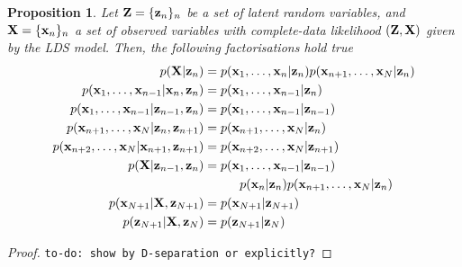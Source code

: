 \documentclass[11pt]{article}
\newtheorem{proposition}{Proposition}[section]
\begin{document}
\begin{proposition}\label{prop:graphical-models-separation}
	Let ${\bf Z} = \{{\bf z}_n\}_n$ be a set of latent random variables, and ${\bf X} = \{{\bf x}_n\}_n$ a set of observed variables with complete-data likelihood $({\bf Z}, {\bf X})$ given by the LDS model. Then, the following factorisations hold true
	\begin{align}
		p({\bf X}\vert{\bf z}_n) &= p({{\bf x}_1, \ldots, {\bf x}_n \vert {\bf z}_n})p({{\bf x}_{n+1}, \ldots, {\bf x}_N \vert {\bf z}_n}) \label{gm:1}\\
		p({\bf x}_1, \ldots, {\bf x}_{n-1}\vert {\bf x}_n, {\bf z}_n) &= p({\bf x}_1, \ldots, {\bf x}_{n-1}\vert {\bf z}_n)\\
		p({\bf x}_1, \ldots, {\bf x}_{n-1}\vert {\bf z}_{n-1}, {\bf z}_{n}) &= p({\bf x}_1, \ldots, {\bf x}_{n-1}\vert {\bf z}_{n-1})\\
		p({\bf x}_{n+1}, \ldots, {\bf x}_N \vert {\bf z}_n, {\bf z}_{n+1}) &= p({\bf x}_{n+1}, \ldots, {\bf x}_N \vert {\bf z}_n)\\
		p({\bf x}_{n+2}, \ldots, {\bf x}_N\vert {\bf x}_{n+1}, {\bf z}_{n+1}) &= p({\bf x}_{n+2}, \ldots, {\bf x}_N \vert {\bf z}_{n+1})\\
		p({\bf X}\vert {\bf z}_{n-1}, {\bf z}_{n}) &= p({\bf x}_1, \ldots, {\bf x}_{n-1}\vert {\bf z}_{n-1}) \nonumber\\
			&\hspace{1cm}p({\bf x}_n\vert {\bf z}_n) p({\bf x}_{n+1}, \ldots, {\bf x}_N \vert {\bf z}_n)\\
		p({\bf x}_{N+1} \vert {\bf X}, {\bf z}_{N+1}) &= p({\bf x}_{N+1} \vert {\bf z}_{N+1})\\
		p({\bf z}_{N+1} \vert {\bf X}, {\bf z}_{N}) &= p({\bf z}_{N+1} \vert {\bf z}_{N})\\
	\end{align}
\end{proposition}

\begin{proof}
	\texttt{to-do: show by D-separation or explicitly?}
\end{proof}
\end{document}
